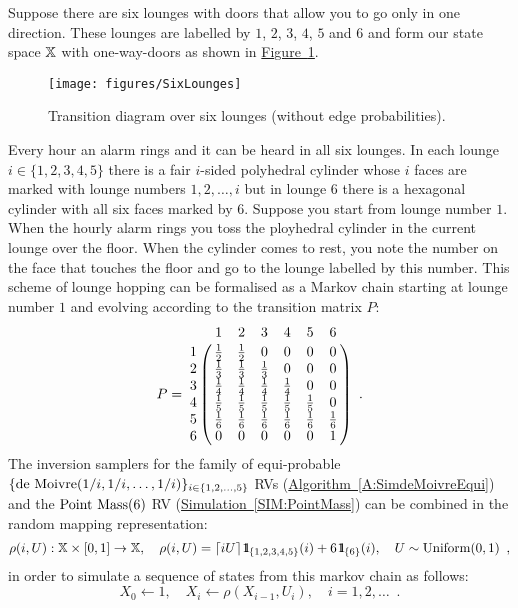\begin{example}\label{EX:SixLounges}  Suppose there are six lounges with  doors that allow you to go only in one direction.  These lounges are labelled by $1$, $2$, $3$, $4$, $5$ and $6$ and form our state space $\mathbb{X}$ with one-way-doors as shown in \hyperref[F:SixLounges]{Figure~\ref*{F:SixLounges}}.  
\begin{figure}[htbp]
\caption{Transition diagram over six lounges (without edge probabilities).\label{F:SixLounges}}
\centering \mbox{\texttt{[image: figures/SixLounges]}} 
\end{figure}
Every hour an alarm rings and it can be heard in all six lounges.  In each lounge $i \in \{1,2,3,4,5\}$ there is a fair $i$-sided polyhedral cylinder whose $i$ faces are marked with lounge numbers $1,2,\ldots,i$ but in lounge $6$ there is a hexagonal cylinder with all six faces marked by $6$.  Suppose you start from lounge number $1$.  When the hourly alarm rings you toss the ployhedral cylinder in the current lounge over the floor.  When the cylinder comes to rest, you note the number on the face that touches the floor and go to the lounge labelled by this number.  
This scheme of lounge hopping can be formalised as a Markov chain starting at lounge number $1$ and evolving according to the  transition matrix $P$:
$$P = 
\bordermatrix{ ~ & 1 & 2 & 3 &  4 & 5 & 6 \cr 
1 & \frac{1}{2} & \frac{1}{2} & 0 & 0 & 0 & 0 \cr
2 & \frac{1}{3} & \frac{1}{3} & \frac{1}{3} & 0 & 0 & 0 \cr
3 & \frac{1}{4} & \frac{1}{4} & \frac{1}{4} & \frac{1}{4} & 0 & 0 \cr
4 & \frac{1}{5} & \frac{1}{5} & \frac{1}{5} & \frac{1}{5} & \frac{1}{5} & 0 \cr
5 & \frac{1}{6} & \frac{1}{6} & \frac{1}{6} & \frac{1}{6} & \frac{1}{6} & \frac{1}{6} \cr
6 & 0 & 0 & 0 & 0 & 0 & 1 } \enspace .
$$
The inversion samplers for the family of equi-probable $\{\mbox{{\rm de~Moivre}}(1/i,1/i,\ldots,1/i)\}_{i \in \{1,2,\ldots,5\}}$ RVs (\hyperref[A:SimdeMoivreEqui]{Algorithm~\ref*{A:SimdeMoivreEqui}}) and the $\mbox{{\rm Point~Mass}}(6)$ RV (\hyperref[SIM:PointMass]{Simulation~\ref*{SIM:PointMass}}) can be combined in the random mapping representation:
$$
 \rho(i,U): \mathbb{X} \times [0,1] \to \mathbb{X}, \quad \rho(i,U) = \lceil i U \rceil \, {1}\mspace{-11 mu}{1}_{\{1,2,3,4,5\}} (i) + 6 \, {1}\mspace{-11 mu}{1}_{\{6\}}(i), \quad U \sim \mbox{{\rm Uniform}}(0,1) \enspace ,$$
in order to simulate a sequence of states from this markov chain as follows:
\begin{equation}\label{E:SimulateSixLounges}
X_0 \gets 1, \quad X_i \gets \rho(X_{i-1},U_i), \quad i=1,2,\ldots \enspace .
\end{equation}
\end{example}

